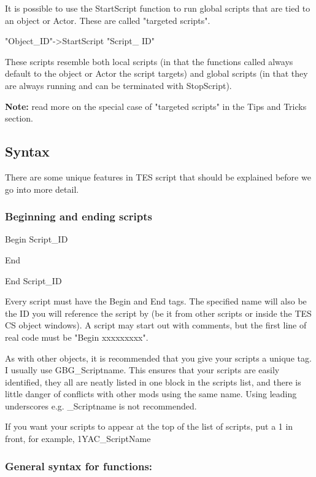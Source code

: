 \documentclass[
]{article}
\begin{document}


It is possible to use the StartScript function to run global scripts
that are tied to an object or Actor. These are called "targeted
scripts".

"Object\_ID"-\textgreater StartScript "Script\_ ID"

These scripts resemble both local scripts (in that the functions called
always default to the object or Actor the script targets) and global
scripts (in that they are always running and can be terminated with
StopScript).

\textbf{Note:} read more on the special case of "targeted scripts" in
the Tips and Tricks section.

\hypertarget{syntax}{%
\subsection{\texorpdfstring{\hfill\break
Syntax}{ Syntax}}\label{syntax}}

There are some unique features in TES script that should be explained
before we go into more detail.

\hypertarget{beginning-and-ending-scripts}{%
\subsubsection{Beginning and ending
scripts}\label{beginning-and-ending-scripts}}

Begin Script\_ID

End

End Script\_ID

Every script must have the Begin and End tags. The specified name will
also be the ID you will reference the script by (be it from other
scripts or inside the TES CS object windows). A script may start out
with comments, but the first line of real code must be "Begin
xxxxxxxxx".

As with other objects, it is recommended that you give your scripts a
unique tag. I usually use GBG\_Scriptname. This ensures that your
scripts are easily identified, they all are neatly listed in one block
in the scripts list, and there is little danger of conflicts with other
mods using the same name. Using leading underscores e.g. \_Scriptname is
not recommended.

If you want your scripts to appear at the top of the list of scripts,
put a 1 in front, for example, 1YAC\_ScriptName

\hypertarget{general-syntax-for-functions}{%
\subsubsection{\texorpdfstring{General syntax for functions:
}{General syntax for functions: }}\label{general-syntax-for-functions}}
\end{document}

